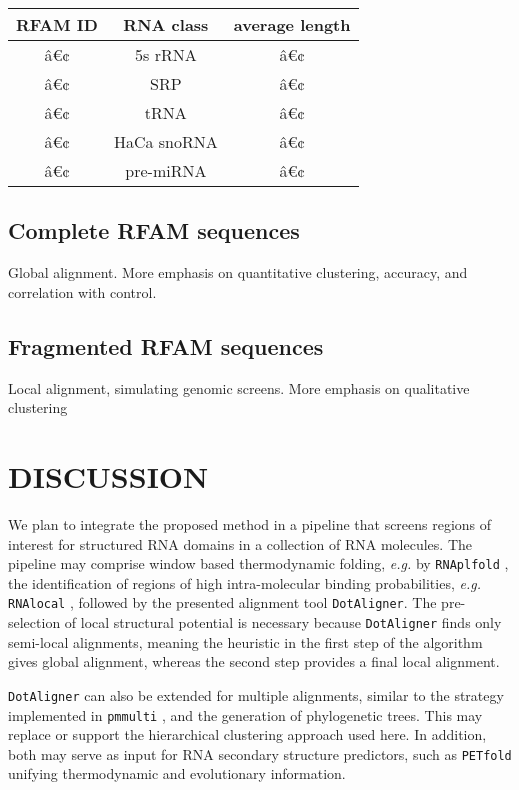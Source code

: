 \documentclass[a4paper,twoside]{article}
\newcommand\dotaligner{\texttt{DotAligner}}
\newcommand\pmmulti{\texttt{pmmulti}}
\newcommand\rnaplfold{\texttt{RNAplfold}}
\newcommand\petfold{\texttt{PETfold}}
\newcommand\rnalocal{\texttt{RNAlocal}}
\newcommand\eg{\textit{e.g.}}
\begin{document}
\begin{tabular}{|c|c|c|}
\hline 
\textbf{RFAM ID} & \textbf{RNA class} & \textbf{average length} \\ 
\hline 
â€¢ & 5s rRNA & â€¢ \\ 
â€¢ & SRP & â€¢ \\ 
â€¢ & tRNA & â€¢ \\ 
â€¢ & HaCa snoRNA & â€¢ \\ 
â€¢ & pre-miRNA & â€¢ \\ 
\hline 
\end{tabular} 


\subsection{Complete RFAM sequences}

Global alignment. More emphasis on quantitative clustering, accuracy, and correlation with control. 


\subsection{Fragmented RFAM sequences} 

Local alignment, simulating genomic screens. More emphasis on qualitative clustering



\section{\uppercase{Discussion}}

\noindent We plan to integrate the proposed method in a pipeline that screens
regions of interest for structured RNA domains in a collection of RNA molecules.
The pipeline may comprise window based thermodynamic folding, \eg{} by
\rnaplfold{} \cite{Bernhart:Hofacker:Stadler:Local_RNA_base:2006}, the
identification of regions of high intra-molecular binding probabilities, \eg{}
\rnalocal{} \cite{Dotu19908358}, followed by the presented alignment tool
\dotaligner. The pre-selection of local structural potential is necessary
because \dotaligner{} finds only semi-local alignments, meaning the heuristic in
the first step of the algorithm gives global alignment, whereas the second step
provides a final local alignment. 

\dotaligner{} can also be extended for multiple alignments, similar to the strategy
implemented in \pmmulti{} \cite{Hofacker15073017}, and the generation of
phylogenetic trees. This may replace or support the hierarchical clustering
approach used here. In addition, both may serve as input for RNA secondary
structure predictors, such as \petfold{} \cite{Seemann2008} unifying
thermodynamic and evolutionary information. 
\end{document}
